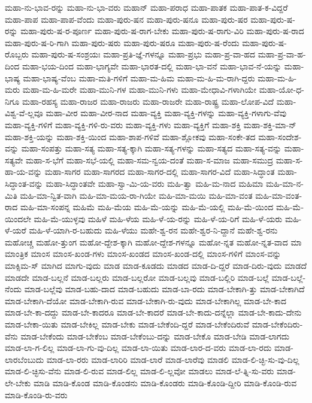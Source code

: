 {ಮಹಾ-ನು-ಭಾವ-ರನ್ನು
ಮಹಾ-ನು-ಭಾ-ವರು
ಮಹಾನ್
ಮಹಾ-ಪರಾಧ
ಮಹಾ-ಪಾತಕ
ಮಹಾ-ಪಾತ-ಕ-ವಿದ್ದರೆ
ಮಹಾ-ಪಾಪ
ಮಹಾ-ಪಾಪ-ವೆಂದು
ಮಹಾ-ಪುರು-ಷನ
ಮಹಾ-ಪುರು-ಷನೂ
ಮಹಾ-ಪುರು-ಷರ
ಮಹಾ-ಪುರು-ಷ-ರನ್ನು
ಮಹಾ-ಪುರು-ಷ-ರ-ಪೂರ್ಣ
ಮಹಾ-ಪುರು-ಷ-ರಾಗ-ಬೇಕು
ಮಹಾ-ಪುರು-ಷ-ರಾಗು-ವಿರಿ
ಮಹಾ-ಪುರು-ಷ-ರಾದ
ಮಹಾ-ಪುರು-ಷ-ರಿ-ಗಾಗಿ
ಮಹಾ-ಪುರು-ಷರು
ಮಹಾ-ಪುರು-ಷರೂ
ಮಹಾ-ಪುರು-ಷ-ರೆಂದು
ಮಹಾ-ಪುರು-ಷ-ರೊಬ್ಬರು
ಮಹಾ-ಪುರು-ಷ-ಸಂಶ್ರಯಃ
ಮಹಾ-ಪ್ರತಿ-ಜ್ಞೆ-ಗಳನ್ನೂ
ಮಹಾ-ಪ್ರಭು
ಮಹಾ-ಪ್ರ-ವಾ-ಹದ
ಮಹಾ-ಪ್ರ-ವಾ-ಹ-ದಿಂದ
ಮಹಾ-ಭಯ-ದಿಂದ
ಮಹಾ-ಭಾಗ್ಯವೇ
ಮಹಾ-ಭಾರತ-ದಲ್ಲಿ
ಮಹಾ-ಭಾ-ವನೆ
ಮಹಾ-ಭಾವ-ನೆ-ಯನ್ನು
ಮಹಾ-ಭಾಷ್ಯ
ಮಹಾ-ಭಾಷ್ಯ-ವೆಂಬ
ಮಹಾ-ಮತಿ-ಗಳಿಗೆ
ಮಹಾ-ಮ-ಹಿಮ
ಮಹಾ-ಮ-ಹಿ-ಮ-ರಾಗಿ-ದ್ದರು
ಮಹಾ-ಮ-ಹಿ-ಮರು
ಮಹಾ-ಮ-ಹಿ-ಮರೇ
ಮಹಾ-ಮುನಿ-ಗಳ
ಮಹಾ-ಮುನಿ-ಗಳು
ಮಹಾ-ಮೇಧಾವಿ-ಗಳಾಗಿಯೇ
ಮಹಾ-ಯೋ-ಧ-ನಿಗೂ
ಮಹಾ-ರಹಸ್ಯ
ಮಹಾ-ರಾಜರ
ಮಹಾ-ರಾಜರು
ಮಹಾ-ರಾಜರೇ
ಮಹಾ-ರಾಷ್ಟ್ರ
ಮಹಾ-ಲೋಪ-ವಿದೆ
ಮಹಾ-ವಿಶ್ವ-ವೆ-ಲ್ಲವೂ
ಮಹಾ-ವೀರ
ಮಹಾ-ವೀರ-ನಾದ
ಮಹಾ-ವ್ಯಕ್ತಿ
ಮಹಾ-ವ್ಯಕ್ತಿ-ಗಳನ್ನು
ಮಹಾ-ವ್ಯಕ್ತಿ-ಗಳಾಗು-ವೆವು
ಮಹಾ-ವ್ಯಕ್ತಿ-ಗಳಿಗೆ
ಮಹಾ-ವ್ಯಕ್ತಿ-ಗಳಿ-ರು-ವರು
ಮಹಾ-ವ್ಯಕ್ತಿ-ಗಳು
ಮಹಾ-ವ್ಯಕ್ತಿಗೆ
ಮಹಾ-ಶಕ್ತಿ
ಮಹಾ-ಶಕ್ತಿ-ಮಾ-ನ್
ಮಹಾ-ಶಕ್ತಿ-ಯನ್ನು
ಮಹಾ-ಶಕ್ತಿ-ಯಿಂದ
ಮಹಾ-ಶಾಪ-ಗಳಿವೆ
ಮಹಾ-ಶ್ಲೋಕವು
ಮಹಾ-ಸಂಕೇ-ತದ
ಮಹಾ-ಸಂದೇಶ-ವನ್ನು
ಮಹಾ-ಸಂಪತ್ತು
ಮಹಾ-ಸತ್ಯ
ಮಹಾ-ಸತ್ಯ-ಕ್ಕಾಗಿ
ಮಹಾ-ಸತ್ಯ-ಗಳನ್ನು
ಮಹಾ-ಸತ್ಯದ
ಮಹಾ-ಸತ್ಯ-ವನ್ನು
ಮಹಾ-ಸತ್ಯವೇ
ಮಹಾ-ಸ-ಭೆಗೆ
ಮಹಾ-ಸಭೆ-ಯಲ್ಲಿ
ಮಹಾ-ಸಮ-ನ್ವಯ-ದಂತೆ
ಮಹಾ-ಸ-ಮಾಜ
ಮಹಾ-ಸಮುದ್ರ
ಮಹಾ-ಸ-ಹಾ-ಯ-ವನ್ನು
ಮಹಾ-ಸಾಗರ
ಮಹಾ-ಸಾಗರದ
ಮಹಾ-ಸಾಗರ-ದಲ್ಲಿ
ಮಹಾ-ಸಾಗರ-ವಿದೆ
ಮಹಾ-ಸಿದ್ಧಾಂತ
ಮಹಾ-ಸಿದ್ಧಾಂತ-ವನ್ನು
ಮಹಾ-ಸಿದ್ಧಾಂತವೇ
ಮಹಾ-ಸ್ವಾ-ಮಿ-ಯ-ವರು
ಮಹಿ-ತ್ವಾ
ಮಹಿ-ಮ-ನಾದ
ಮಹಿಮಾ
ಮಹಿ-ಮಾ-ನ-ಮಿತಿ
ಮಹಿ-ಮಾ-ನ್ವಿತ-ವಾಗಿ
ಮಹಿ-ಮಾ-ಮಯ-ರಾ-ಗಿಯೇ
ಮಹಿ-ಮಾ-ಮಯಿ
ಮಹಿ-ಮಾ-ವಂತ
ಮಹಿ-ಮಾ-ವಂತ-ರಾದ
ಮಹಿ-ಮಾ-ಸಂಪನ್ನ
ಮಹಿಮೆ
ಮಹಿ-ಮೆಯ
ಮಹಿ-ಮೆ-ಯನ್ನು
ಮಹಿ-ಮೆ-ಯಲ್ಲಿ
ಮಹಿ-ಮೆ-ಯಿಂದ
ಮಹಿ-ಮೆ-ಯಿಂದಲೇ
ಮಹಿ-ಮೆ-ಯುಳ್ಳವು
ಮಹಿಳೆ
ಮಹಿ-ಳೆಯ
ಮಹಿ-ಳೆ-ಯ-ರನ್ನು
ಮಹಿ-ಳೆ-ಯ-ರಿಗೆ
ಮಹಿ-ಳೆ-ಯರು
ಮಹಿ-ಳೆ-ಯರೆ
ಮಹಿ-ಳೆ-ಯಾಗಿ-ರ-ಬಹುದು
ಮಹಿ-ಳೆಯು
ಮಹೇ-ಶ್ವ-ರನ
ಮಹೇ-ಶ್ವರ-ನಿ-ದ್ದಾನೆ
ಮಹೇ-ಶ್ವ-ರನು
ಮಹೋಚ್ಚ
ಮಹೋ-ತ್ತುಂಗ
ಮಹೋ-ದ್ದೇಶ-ಕ್ಕಾಗಿ
ಮಹೋ-ದ್ದೇಶ-ಗಳನ್ನೂ
ಮಹೋ-ನ್ನತ
ಮಹೋ-ನ್ನತ-ವಾದ
ಮಾ
ಮಾಂತ್ರಿಕ
ಮಾಂಸ
ಮಾಂಸ-ಖಂಡ-ಗಳು
ಮಾಂಸ-ಖಂಡದ
ಮಾಂಸ-ಖಂಡ-ದಲ್ಲಿ
ಮಾಂಸ-ಗಳಿಗೆ
ಮಾಂಸ-ವನ್ನು
ಮಾಕ್ಸಿಮ-ಸ್
ಮಾಗಿದ
ಮಾಗು-ವುದು
ಮಾಡ
ಮಾಡ-ಕೂಡದು
ಮಾಡದ
ಮಾಡ-ದಿ-ದ್ದರೆ
ಮಾಡ-ದಿರು-ವುದು
ಮಾಡದೆ
ಮಾಡದೇ
ಮಾಡ-ಬಲ್ಲನೆ
ಮಾಡ-ಬಲ್ಲರು
ಮಾಡ-ಬಲ್ಲರೋ
ಮಾಡ-ಬಲ್ಲವು
ಮಾಡ-ಬಲ್ಲಿರಿ
ಮಾಡ-ಬಲ್ಲೆ
ಮಾಡ-ಬಲ್ಲೆ-ನೆಂದು
ಮಾಡ-ಬಲ್ಲೆವು
ಮಾಡ-ಬಹು-ದಾದ
ಮಾಡ-ಬಹುದು
ಮಾಡ-ಬಾ-ರದು
ಮಾಡ-ಬೇಕಾಗಿ-ತ್ತು
ಮಾಡ-ಬೇಕಾಗಿದೆ
ಮಾಡ-ಬೇಕಾಗಿ-ದೆಯೋ
ಮಾಡ-ಬೇಕಾಗಿ-ರುವ
ಮಾಡ-ಬೇಕಾಗಿ-ರು-ವುದು
ಮಾಡ-ಬೇಕಾಗಿಲ್ಲ
ಮಾಡ-ಬೇ-ಕಾದ
ಮಾಡ-ಬೇ-ಕಾ-ದದ್ದು
ಮಾಡ-ಬೇ-ಕಾದರೂ
ಮಾಡ-ಬೇ-ಕಾದರೆ
ಮಾಡ-ಬೇ-ಕಾದು-ದನ್ನೆಲ್ಲಾ
ಮಾಡ-ಬೇ-ಕಾದು-ದೇನು
ಮಾಡ-ಬೇಕಾ-ಯಿತು
ಮಾಡ-ಬೇಕಿಲ್ಲ
ಮಾಡ-ಬೇಕು
ಮಾಡ-ಬೇಕೆಂದಿ-ದ್ದರೆ
ಮಾಡ-ಬೇಕೆಂದಿರುವೆ
ಮಾಡ-ಬೇಕೆಂದಿರು-ವೆನು
ಮಾಡ-ಬೇಕೆಂದು
ಮಾಡ-ಬೇಕೆಂಬ
ಮಾಡ-ಬೇಕೆಂಬು-ದನ್ನು
ಮಾಡ-ಬೇಕೊ
ಮಾಡ-ಬೇಡಿ
ಮಾಡ-ಲಾಗದು
ಮಾಡ-ಲಾ-ಗ-ಲಿಲ್ಲ
ಮಾಡ-ಲಾ-ಗು-ವು-ದಿಲ್ಲ
ಮಾಡ-ಲಾ-ಯಿತು
ಮಾಡ-ಲಾರ-ದ-ವರು
ಮಾಡ-ಲಾ-ರದು
ಮಾಡ-ಲಾರಬೆಂಬುದು
ಮಾಡ-ಲಾ-ರರು
ಮಾಡ-ಲಾರಿರಿ
ಮಾಡ-ಲಾರೆ
ಮಾಡ-ಲಾರೆವು
ಮಾಡಲಿ
ಮಾಡ-ಲಿ-ಚ್ಛಿ-ಸು-ವು-ದಿಲ್ಲ
ಮಾಡ-ಲಿ-ಚ್ಛಿಸು-ವೆನು
ಮಾಡ-ಲಿ-ರುವ
ಮಾಡ-ಲಿಲ್ಲ
ಮಾಡ-ಲಿ-ಲ್ಲವೋ
ಮಾಡಲು
ಮಾಡ-ಲೆ-ತ್ನಿ-ಸು-ವರು
ಮಾಡ-ಲೇ-ಬೇಕು
ಮಾಡಿ
ಮಾಡಿ-ಕೊಂಡ
ಮಾಡಿ-ಕೊಂಡನು
ಮಾಡಿ-ಕೊಂಡರು
ಮಾಡಿ-ಕೊಂಡಿ-ದ್ದೀರಿ
ಮಾಡಿ-ಕೊಂಡಿ-ರುವ
ಮಾಡಿ-ಕೊಂಡಿ-ರು-ವರು
}
